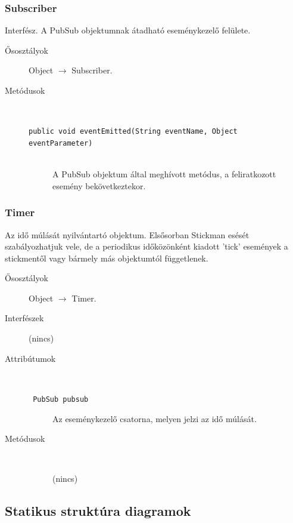 		\subsubsection{Subscriber} Interfész.
				 A PubSub objektumnak átadható eseménykezelő felülete. 			\begin{description}


				\item[Ősosztályok] Object $\rightarrow{}$ Subscriber.
				\item[Metódusok]$\ $
					\begin{description}
						\item[\texttt{public void eventEmitted(String eventName, Object eventParameter)}] \hfill \\ A PubSub objektum által meghívott metódus,  a feliratkozott esemény bekövetkeztekor. 
					\end{description}
			\end{description}

		\subsubsection{Timer}
				 Az idő múlását nyilvántartó objektum.   Elsősorban Stickman esését szabályozhatjuk vele, de a  periodikus időközönként kiadott 'tick' események  a stickmentől vagy bármely más objektumtól függetlenek.  			\begin{description}


				\item[Ősosztályok] Object $\rightarrow{}$ Timer.
				\item[Interfészek] (nincs)
				\item[Attribútumok]$\ $
					\begin{description}
						\item[\texttt{ PubSub pubsub}] Az eseménykezelő csatorna,  melyen jelzi az idő múlását. 
					\end{description}
				\item[Metódusok]$\ $
					\begin{description}
						\item[] (nincs)
					\end{description}
			\end{description}


	\subsection{Statikus struktúra diagramok}

